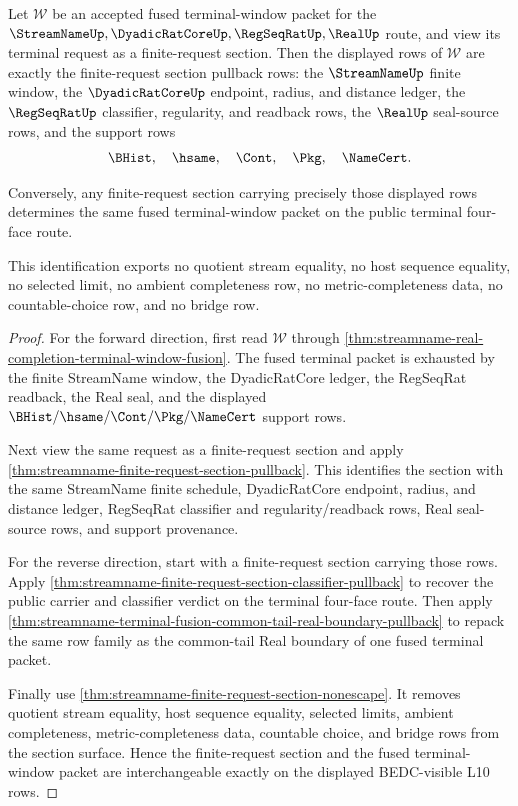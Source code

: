 \begin{theorem}
\label{thm:streamname-terminal-fusion-finite-request-section-exactness}
Let $\mathcal W$ be an accepted fused terminal-window packet for the
$\StreamNameUp,\DyadicRatCoreUp,\RegSeqRatUp,\RealUp$ route, and view its
terminal request as a finite-request section. Then the displayed rows of
$\mathcal W$ are exactly the finite-request section pullback rows: the
$\StreamNameUp$ finite window, the $\DyadicRatCoreUp$ endpoint, radius, and
distance ledger, the $\RegSeqRatUp$ classifier, regularity, and readback rows,
the $\RealUp$ seal-source rows, and the support rows
$$
\BHist,\quad \hsame,\quad \Cont,\quad \Pkg,\quad \NameCert.
$$

Conversely, any finite-request section carrying precisely those displayed rows
determines the same fused terminal-window packet on the public terminal
four-face route.

This identification exports no quotient stream equality, no host sequence
equality, no selected limit, no ambient completeness row, no
metric-completeness data, no countable-choice row, and no bridge row.
\end{theorem}
\begin{proof}
For the forward direction, first read $\mathcal W$ through
\autoref{thm:streamname-real-completion-terminal-window-fusion}. The fused
terminal packet is exhausted by the finite StreamName window, the DyadicRatCore
ledger, the RegSeqRat readback, the Real seal, and the displayed
$\BHist/\hsame/\Cont/\Pkg/\NameCert$ support rows.

Next view the same request as a finite-request section and apply
\autoref{thm:streamname-finite-request-section-pullback}. This identifies the
section with the same StreamName finite schedule, DyadicRatCore endpoint,
radius, and distance ledger, RegSeqRat classifier and regularity/readback
rows, Real seal-source rows, and support provenance.

For the reverse direction, start with a finite-request section carrying those
rows. Apply
\autoref{thm:streamname-finite-request-section-classifier-pullback} to recover
the public carrier and classifier verdict on the terminal four-face route.
Then apply
\autoref{thm:streamname-terminal-fusion-common-tail-real-boundary-pullback} to
repack the same row family as the common-tail Real boundary of one fused
terminal packet.

Finally use \autoref{thm:streamname-finite-request-section-nonescape}. It
removes quotient stream equality, host sequence equality, selected limits,
ambient completeness, metric-completeness data, countable choice, and bridge
rows from the section surface. Hence the finite-request section and the fused
terminal-window packet are interchangeable exactly on the displayed BEDC-visible
L10 rows.
\end{proof}

